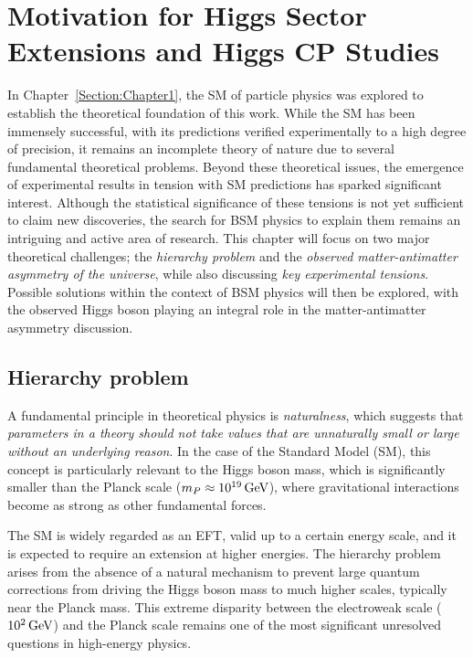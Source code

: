\chapter{Motivation for Higgs Sector Extensions and Higgs CP Studies}
\thispagestyle{plain}  %
\pagestyle{chapterpages}
\label{Section:Chapter2}

\minitoc


In Chapter~\ref{Section:Chapter1}, the SM of particle physics was explored to establish the theoretical foundation of this work. While the SM has been immensely successful, with its predictions verified experimentally to a high degree of precision, it remains an incomplete theory of nature due to several fundamental theoretical problems. Beyond these theoretical issues, the emergence of experimental results in tension with SM predictions has sparked significant interest. Although the statistical significance of these tensions is not yet sufficient to claim new discoveries, the search for BSM physics to explain them remains an intriguing and active area of research. This chapter will focus on two major theoretical challenges; the \textit{hierarchy problem} and the \textit{observed matter-antimatter asymmetry of the universe}, while also discussing \textit{key experimental tensions}. Possible solutions within the context of BSM physics will then be explored, with the observed Higgs boson playing an integral role in the matter-antimatter asymmetry discussion.

\section{Hierarchy problem}

A fundamental principle in theoretical physics is \textit{naturalness}, which suggests that \textit{parameters in a theory should not take values that are unnaturally small or large without an underlying reason}. In the case of the Standard Model (SM), this concept is particularly relevant to the Higgs boson mass, which is significantly smaller than the Planck scale ($m_P \approx 10^{19} \,\text{Ge\hspace{-.08em}V}$), where gravitational interactions become as strong as other fundamental forces.

The SM is widely regarded as an \ac{EFT}, valid up to a certain energy scale, and it is expected to require an extension at higher energies. The hierarchy problem arises from the absence of a natural mechanism to prevent large quantum corrections from driving the Higgs boson mass to much higher scales, typically near the Planck mass. This extreme disparity between the electroweak scale ($10^2 \,\text{Ge\hspace{-.08em}V}$) and the Planck scale remains one of the most significant unresolved questions in high-energy physics.


